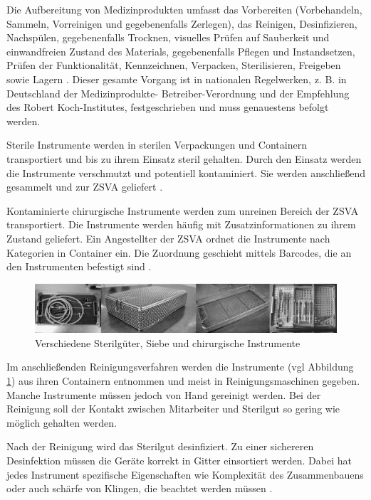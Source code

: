 Die Aufbereitung von Medizinprodukten umfasst das Vorbereiten (Vorbehandeln, Sammeln, Vorreinigen und gegebenenfalls Zerlegen), das Reinigen, Desinfizieren, Nachspülen, gegebenenfalls Trocknen, visuelles Prüfen auf Sauberkeit und einwandfreien Zustand des Materials, gegebenenfalls Pflegen und Instandsetzen, Prüfen der Funktionalität, Kennzeichnen, Verpacken, Sterilisieren, Freigeben sowie Lagern \cite{AKI-ArbeitskreisInstrumenten-Aufbereitung2012}. Dieser gesamte Vorgang ist in nationalen Regelwerken, z. B. in Deutschland der Medizinprodukte- Betreiber-Verordnung und der Empfehlung des Robert Koch-Institutes, festgeschrieben und muss genauestens befolgt werden.

Sterile Instrumente werden in sterilen Verpackungen und Containern transportiert und bis zu ihrem Einsatz steril gehalten. Durch den Einsatz werden die Instrumente verschmutzt und potentiell kontaminiert. Sie werden anschließend gesammelt und zur ZSVA geliefert \cite[S.~7]{Ruther2014}.


Kontaminierte chirurgische Instrumente werden zum unreinen Bereich der ZSVA transportiert. Die Instrumente werden häufig mit Zusatzinformationen zu ihrem Zustand geliefert. Ein Angestellter der ZSVA ordnet die Instrumente nach Kategorien in Container ein. Die Zuordnung geschieht mittels Barcodes, die an den Instrumenten befestigt sind \cite[S.~9]{Ruther2014}.

\begin{figure}[htbp]
    \centering
    \includegraphics[width=1\textwidth]{data/bilder/Sterilgut_Siebe_Quelle_DGSV.pdf}
    \caption{Verschiedene Sterilgüter, Siebe und chirurgische Instrumente \cite{DGSV-DeutscheGesellschaftfurSterilgutversorgung2004}}
    \label{fig:Siebe_In_ZSVA}
\end{figure}

Im anschließenden Reinigungsverfahren werden die Instrumente (vgl Abbildung \ref{fig:Siebe_In_ZSVA}) aus ihren Containern entnommen und meist in Reinigungsmaschinen gegeben. Manche Instrumente müssen jedoch von Hand gereinigt werden. Bei der Reinigung soll der Kontakt zwischen Mitarbeiter und Sterilgut so gering wie möglich gehalten werden. 

Nach der Reinigung wird das Sterilgut desinfiziert. Zu einer sichereren Desinfektion müssen die Geräte korrekt in Gitter einsortiert werden. Dabei hat jedes Instrument spezifische Eigenschaften wie Komplexität des Zusammenbauens oder auch schärfe von Klingen, die beachtet werden müssen \cite[S.~11]{Ruther2014}.

